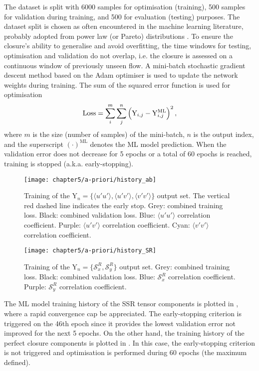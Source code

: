 \documentclass[../main.tex]{subfiles}
\begin{document}
The dataset is split with 6000 samples for optimisation (training), 500 samples for validation during training, and 500 for evaluation (testing) purposes.
The dataset split is chosen as often encountered in the machine learning literature, probably adopted from power law (or Pareto) distributions \citep{Newman2005}.
To ensure the closure's ability to generalise and avoid overfitting, the time windows for testing, optimisation and validation do not overlap, i.e. the closure is assessed on a continuous window of previously unseen flow.
A mini-batch stochastic gradient descent method based on the Adam optimiser \citep{Kingma2014} is used to update the network weights during training.
The sum of the squared error function is used for optimisation
\begin{equation}
\mathrm{Loss}=\sum^m_i\sum^n_j \left(\mathrm{Y}_{i,j}-\mathrm{Y}_{i,j}^{\mathrm{ML}} \right)^2,
\end{equation}
where $m$ is the size (number of samples) of the mini-batch, $n$ is the output index, and the superscript $(\cdot)^{\mathrm{ML}}$ denotes the ML model prediction.
When the validation error does not decrease for 5 epochs or a total of 60 epochs is reached, training is stopped (a.k.a. early-stopping).

\begin{figure}[!t]
\setlength{\columnsep}{-1pt} 
\begin{multicols}{2}
\centering
\texttt{[image: chapter5/a-priori/history\_ab]}
\caption{Training of the $\mathrm{Y}_n=\big\lbrace\langle u' u'\rangle,\langle u' v'\rangle,\langle v' v'\rangle\big\rbrace$ output set.
The vertical red dashed line indicates the early stop.
Grey: combined training loss.
Black: combined validation loss.
Blue: $\langle u' u'\rangle$ correlation coefficient.
Purple: $\langle u' v'\rangle$ correlation coefficient.
Cyan: $\langle v' v'\rangle$ correlation coefficient.}\label{fig:ab_history}

\texttt{[image: chapter5/a-priori/history\_SR]}
\caption{Training of the $\mathrm{Y}_n=\big\lbrace \mathcal{S}^R_x, \mathcal{S}^R_y \big\rbrace$ output set.
Grey: combined training loss.
Black: combined validation loss.
Blue: $\mathcal{S}^R_x$ correlation coefficient.
Purple: $\mathcal{S}^R_y$ correlation coefficient.}
\label{fig:SR_history}
\end{multicols}
\end{figure}

The ML model training history of the SSR tensor components is plotted in , where a rapid convergence cap be appreciated.
The early-stopping criterion is triggered on the 46th epoch since it provides the lowest validation error not improved for the next 5 epochs.
On the other hand, the training history of the perfect closure components is plotted in .
In this case, the early-stopping criterion is not triggered and optimisation is performed during 60 epochs (the maximum defined).
\end{document}
